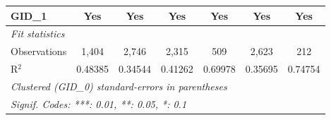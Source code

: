 \begin{table}[H]
\begin{tabular}{lcccccc}
      GID\_1                             & Yes      & Yes            & Yes           & Yes          & Yes            & Yes\\  
      \midrule
      \emph{Fit statistics}\\
      Observations                       & 1,404    & 2,746          & 2,315         & 509          & 2,623          & 212\\  
      R$^2$                              & 0.48385  & 0.34544        & 0.41262       & 0.69978      & 0.35695        & 0.74754\\  
      \midrule \midrule
      \multicolumn{7}{l}{\emph{Clustered (GID\_0) standard-errors in parentheses}}\\
      \multicolumn{7}{l}{\emph{Signif. Codes: ***: 0.01, **: 0.05, *: 0.1}}\\
   \end{tabular}
\end{table}



